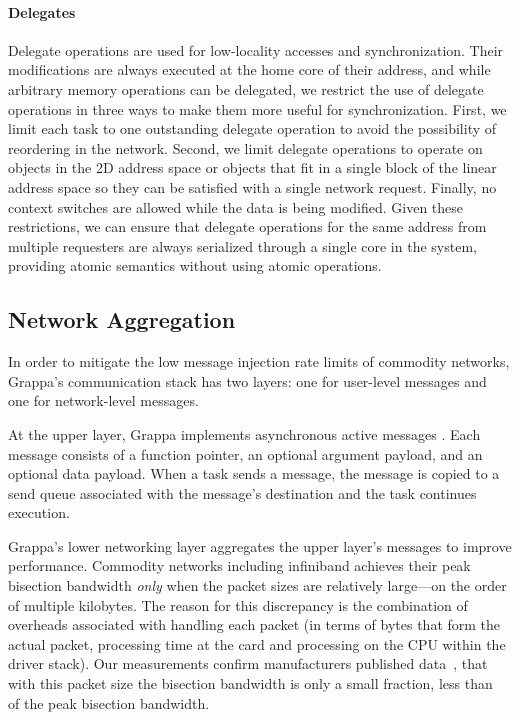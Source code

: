 \paragraph{Delegates} Delegate operations are used for low-locality
accesses and synchronization. Their modifications are always executed at
the home core of their address, and while arbitrary memory operations
can be delegated, we restrict the use of delegate operations in three
ways to make them more useful for synchronization. First, we limit each
task to one outstanding delegate operation to avoid the possibility of
reordering in the network. Second, we limit delegate operations to
operate on objects in the 2D address space or objects that fit in a
single block of the linear address space so they can be satisfied with a
single network request. Finally, no context switches are allowed while
the data is being modified. Given these restrictions, we can ensure that
delegate operations for the same address from multiple requesters are
always serialized through a single core in the system, providing atomic
semantics without using atomic operations.


\subsection{Network Aggregation}

In order to mitigate the low message injection rate limits of commodity
networks, Grappa's communication stack has two layers: one for
user-level messages and one for network-level messages. 

At the upper layer, Grappa implements asynchronous active messages
\cite{vonEicken92}. Each message consists of a function pointer, an
optional argument payload, and an optional data payload. When a task
sends a message, the message is copied to a send queue associated with
the message's destination and the task continues execution.

Grappa's lower networking layer aggregates the upper layer's messages
to improve performance. Commodity networks including infiniband
achieves their peak bisection bandwidth \emph{only} when the packet
sizes are relatively large---on the order of multiple kilobytes. The
reason for this discrepancy is the combination of overheads associated
with handling each packet (in terms of bytes that form the actual
packet, processing time at the card and processing on the
CPU within the driver stack). Our measurements confirm manufacturers
published data~\cite{infinibandbandwidth}, that with this packet size
the bisection bandwidth is only a small fraction, less than
~ of the peak bisection bandwidth.

